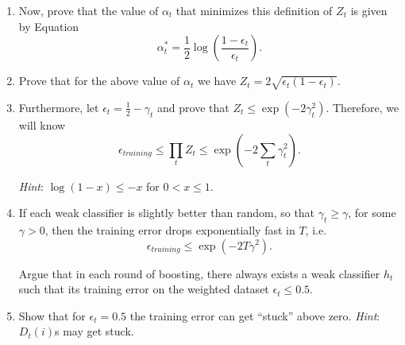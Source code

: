 \documentclass[english]{article}
\begin{document}
\begin{enumerate}
  In this question, you will prove that for binary weak classifiers,
  $Z_t$ from 
\begin{equation}
    \label{boosting:normalization_expression} Z_t = \sum_{i=1}^m D_t(i)
    \exp(-\alpha_t y_i h_t(x_i)).
  \end{equation}
 is minimized by picking $\alpha_t$ as:
  \begin{equation}\label{eq:alpha}
    \alpha_t^* = \frac{1}{2}\log\left( \frac{1 - \epsilon_t}{\epsilon_t}
    \right),
  \end{equation}
  where $\epsilon_t$ is the training error of weak classifier $h_t$
  for the weighted dataset:
  \[
  \epsilon_t = \sum_{i=1}^m D_{t}(i) I(h_t(x_i) \neq y_i).
  \]
  where $I$ is the indicator function. For this proof, only consider
  the simplest case of binary classifiers, i.e. the output of $h_t(x)$
  is binary, \{$-1,+1$\}.

  For this special class of classifiers, first show that the
  normalizer $Z_t$ can be written as:
  \[
  Z_t = (1-\epsilon_t)\exp(-\alpha_t) + \epsilon_t\exp(\alpha_t).
  \]

  {\em Hint}: Consider the sums over correctly and incorrectly
  classified examples separately.


\item  Now, prove that the value of $\alpha_t$ that
  minimizes this definition of $Z_t$ is given by Equation
 \begin{equation}
    \alpha_t^* = \frac{1}{2}\log\left( \frac{1 - \epsilon_t}{\epsilon_t}
    \right).
  \end{equation}


\item Prove that for the above value of $\alpha_t$ we
  have $Z_t = 2\sqrt{\epsilon_t(1-\epsilon_t)}$.


\item Furthermore, let $\epsilon_t=\frac{1}{2}-\gamma_t$
  and prove that $Z_t\leq \exp(-2\gamma_t^2)$.  Therefore, we will
  know
  \begin{equation*}
    \epsilon_{training} \le \prod_tZ_t \le
    \exp(-2\sum_t\gamma_t^2).
  \end{equation*}

  {\em Hint}: $\log(1-x)\leq -x$ for $0<x\leq 1$.

\item If each weak classifier is slightly better than
  random, so that $\gamma_t \ge \gamma$, for some $\gamma > 0$, then
  the training error drops exponentially fast in $T$, i.e.
  \[\epsilon_{training}\leq \exp(-2T\gamma^2).\]

  Argue that in each round of boosting, there always exists a weak
  classifier $h_t$ such that its training error on the weighted
  dataset $\epsilon_t \le 0.5$.


\item Show that for $\epsilon_t = 0.5$ the training error
  can get ``stuck'' above zero.  {\em Hint}: $D_t(i)$s may get stuck.
\end{enumerate}
\end{document}
